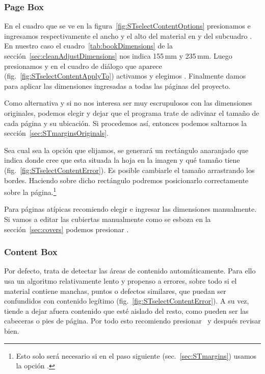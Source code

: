 \documentclass[%
	a5paper,
	10pt,
	twoside,
	openright,
	final,
]{memoir}
\begin{document}
{	\subsubsection{Page Box} En el cuadro  que se ve en la figura~\ref{fig:STselectContentOptions} presionamos  e ingresamos respectivamente el ancho y el alto del material en  y  del subcuadro . En nuestro caso el cuadro~\ref{tab:bookDimensions} de la sección~\ref{sec:cleanAdjustDimensions} nos indica 155\,mm y 235\,mm. Luego presionamos  y en el cuadro de diálogo que aparece (fig.~\ref{fig:STselectContentApplyTo}) activamos  y elegimos . Finalmente damos  para aplicar las dimensiones ingresadas a todas las páginas del proyecto.

	Como alternativa y si no nos interesa ser muy escrupulosos con las dimensiones originales, podemos elegir  y dejar que el programa trate de adivinar el tamaño de cada página y su ubicación. Si procedemos así, entonces podemos saltarnos la sección~\ref{sec:STmarginsOriginals}.

	Sea cual sea la opción que elijamos, se generará un rectángulo anaranjado que indica donde \scantailor cree que esta situada la hoja en la imagen y qué tamaño tiene (fig.~\ref{fig:STselectContentError}). Es posible cambiarle el tamaño arrastrando los bordes. Haciendo  sobre dicho rectángulo podremos posicionarlo correctamente sobre la página.\footnote{Esto solo será necesario si en el paso siguiente (sec.~\ref{sec:STmargins}) usamos la opción .}

	Para páginas atípicas recomiendo elegir  e ingresar las dimensiones manualmente. Si vamos a editar las cubiertas manualmente como se esboza en la sección~\ref{sec:covers} podemos presionar .

	\subsubsection{Content Box} Por defecto, \scantailor trata de detectar las áreas de contenido automáticamente. Para ello usa un algoritmo relativamente lento y propenso a errores, sobre todo si el material contiene manchas, puntos o defectos similares, que puedan ser confundidos con contenido legítimo (fig.~\ref{fig:STselectContentError}). A su vez, tiende a dejar afuera contenido que esté aislado del resto, como pueden ser las cabeceras o pies de página. Por todo esto recomiendo presionar \play\ y después revisar bien.

}
\end{document}
